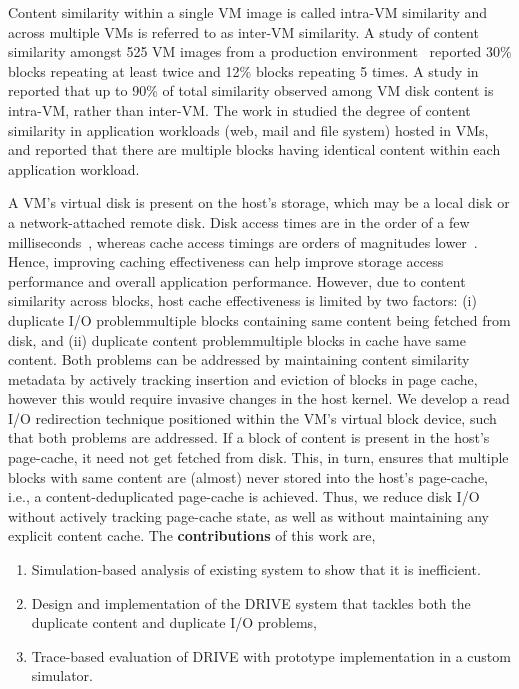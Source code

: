 Content similarity within a single VM image is called intra-VM similarity and across multiple
VMs is referred to as inter-VM similarity. A study of content similarity amongst 525 VM images
from a production environment~\cite{similarity}
reported 30\% blocks repeating at least twice and 12\% blocks
repeating 5 times. A study in \cite{intra-higherthan-inter} 
reported that up to 90\% of total similarity observed among VM
disk content is intra-VM, rather than inter-VM. 
The work in \cite{iodedup} 
studied the degree of content
similarity in application workloads (web, mail and file system) hosted in VMs, and reported that
there are multiple blocks having identical content within each application workload.

A VM's virtual disk is present on the host's storage, which may be a local disk 
or a network-attached remote disk. 
Disk access times are in the order of a few 
milliseconds~\cite{google, data-domain}, whereas cache
access timings are orders of magnitudes lower~\cite{pagecache, satori}. 
Hence, improving caching effectiveness can
help improve storage access performance and overall application performance. However, due to
content similarity across blocks, host cache effectiveness is limited by two factors: (i) duplicate
I/O problem\textemdash{}multiple blocks containing same content being fetched from disk, 
and (ii) duplicate content problem\textemdash{}multiple blocks in cache have same content. 
Both problems can be
addressed by maintaining content similarity metadata by actively tracking insertion and eviction
of blocks in page cache, however this would require invasive changes in the host kernel.
We develop a read I/O redirection technique positioned within the VM's virtual block device,
such that both problems are addressed. If a block of content is present in the host's page-cache,
it need not get fetched from disk. This, in turn, ensures that multiple blocks with same content
are (almost) never stored into the host's page-cache, i.e., a content-deduplicated page-cache is
achieved. Thus, we reduce disk I/O without actively tracking page-cache state, as well as without
maintaining any explicit content cache. The \textbf{contributions} of this work are,
\begin{enumerate}
	\singlespacing
\item Simulation-based analysis of existing system \cite{iodedup} to show that it is inefficient.
\item Design and implementation of the DRIVE system that tackles both the duplicate content
and duplicate I/O problems,
\item Trace-based evaluation of DRIVE with prototype implementation in a custom simulator.
\end{enumerate}

